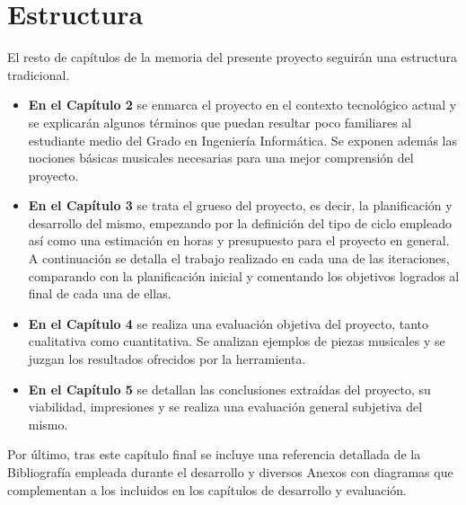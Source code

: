  
 \section{Estructura}
  \label{sec:project_structure}
 El resto de capítulos de la memoria del presente proyecto seguirán una estructura tradicional. 
 \begin{itemize}
 	\item \textbf{En el Capítulo 2} se enmarca el proyecto en el contexto tecnológico actual y se explicarán algunos términos que puedan resultar poco familiares al estudiante medio del Grado en Ingeniería Informática. Se exponen además las nociones básicas musicales necesarias para una mejor comprensión del proyecto.
 	\item \textbf{En el Capítulo 3} se trata el grueso del proyecto, es decir, la planificación y desarrollo del mismo, empezando por la definición del tipo de ciclo empleado así como una estimación en horas y presupuesto para el proyecto en general. A continuación se detalla el trabajo realizado en cada una de las iteraciones, comparando con la planificación inicial y comentando los objetivos logrados al final de cada una de ellas.
  	\item \textbf{En el Capítulo 4} se realiza una evaluación objetiva del proyecto, tanto cualitativa como cuantitativa. Se analizan ejemplos de piezas musicales y se juzgan los resultados ofrecidos por la herramienta.
 	\item \textbf{En el Capítulo 5} se detallan las conclusiones extraídas del proyecto, su viabilidad, impresiones y se realiza una evaluación general subjetiva del mismo.
 \end{itemize}
 Por último, tras este capítulo final se incluye una referencia detallada de la Bibliografía empleada durante el desarrollo y diversos Anexos con diagramas que complementan a los incluidos en los capítulos de desarrollo y evaluación.
 
